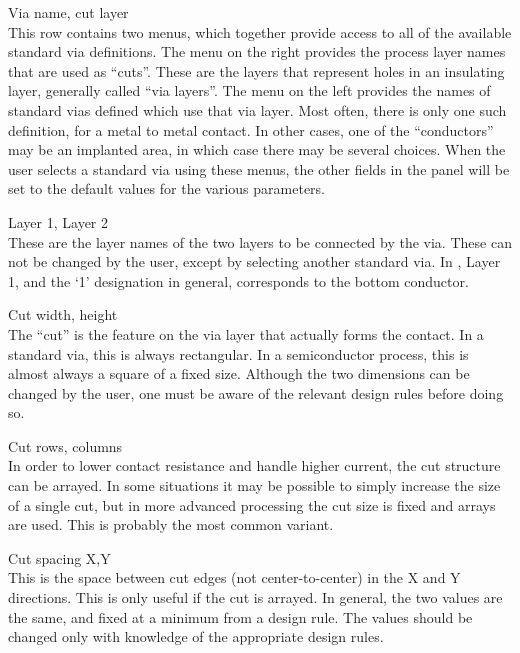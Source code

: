 \begin{description}
\item{\cb Via name, cut layer}\\
This row contains two menus, which together provide access to all of
the available standard via definitions.  The menu on the right
provides the process layer names that are used as ``cuts''.  These are
the layers that represent holes in an insulating layer, generally
called ``via layers''.  The menu on the left provides the names of
standard vias defined which use that via layer.  Most often, there is
only one such definition, for a metal to metal contact.  In other
cases, one of the ``conductors'' may be an implanted area, in which
case there may be several choices.  When the user selects a standard
via using these menus, the other fields in the panel will be set to
the default values for the various parameters.

\item{\cb Layer 1, Layer 2}\\
These are the layer names of the two layers to be connected by the
via.  These can not be changed by the user, except by selecting
another standard via.  In {\Xic}, {\cb Layer 1}, and the `1'
designation in general, corresponds to the bottom conductor.

\item{\cb Cut width, height}\\
The ``cut'' is the feature on the via layer that actually forms the
contact.  In a standard via, this is always rectangular.  In a
semiconductor process, this is almost always a square of a fixed size. 
Although the two dimensions can be changed by the user, one must be
aware of the relevant design rules before doing so.

\item{\cb Cut rows, columns}\\
In order to lower contact resistance and handle higher current, the
cut structure can be arrayed.  In some situations it may be possible
to simply increase the size of a single cut, but in more advanced
processing the cut size is fixed and arrays are used.  This is
probably the most common variant.

\item{\cb Cut spacing X,Y}\\
This is the space between cut edges (not center-to-center) in the X
and Y directions.  This is only useful if the cut is arrayed.  In
general, the two values are the same, and fixed at a minimum from a
design rule.  The values should be changed only with knowledge of the
appropriate design rules.


\end{description}

